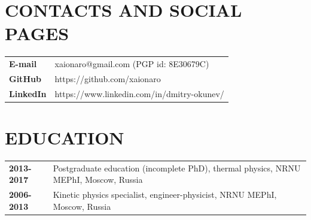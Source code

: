 

\begin{resume}
\vspace{0.1in}

\section{CONTACTS AND SOCIAL PAGES}
\vspace{0.1in} 
\begin{tabular}{ll}
 {\bf E-mail}   & xaionaro@gmail.com (PGP id: 8E30679C)\\
 {\bf GitHub}   & https://github.com/xaionaro\\
 {\bf LinkedIn} & https://www.linkedin.com/in/dmitry-okunev/\\
\end{tabular}

\section{EDUCATION}
\vspace{0.1in} 
\begin{tabular}{ll}
 {\bf 2013-2017} & Postgraduate education (incomplete PhD), thermal physics, NRNU MEPhI, Moscow, Russia\\
 {\bf 2006-2013} & Kinetic physics specialist, engineer-physicist, NRNU MEPhI, Moscow, Russia\\
\end{tabular}


\end{resume}
